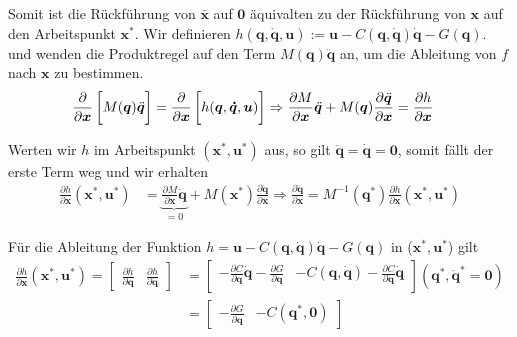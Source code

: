 \documentclass[a4paper, 12pt]{scrartcl}
\begin{document}
Somit ist die Rückführung von $\bar{\bm{x}}$ auf $\bm{0}$ 
äquivalten zu der Rückführung von $\bm{x}$ auf den Arbeitspunkt $\bm{x}^*$.
Wir definieren 
$h(\bm{q} , \bm{\dot{q}}, \bm{u}):= \bm{u} - C(\bm{q},\bm{\dot{q}}) \bm{\dot{q}} - G(\bm{q})$.
und wenden die Produktregel auf den Term $M(\bm{q}) \ddot{\bm{q}}$ an, um die Ableitung von $f$ nach $\bm{x}$ zu bestimmen.
\begin{align*}
    \frac{\partial}{\partial \bm{x}} 
    \left[ 
        \vphantom{\int}
        M(\bm{q}) \ddot{\bm{q}}
    \right] 
    &= 
    \frac{\partial}{\partial \bm{x}} 
    \left[
        \vphantom{\int}
        h(\bm{q}, \bm{\dot{q}}, \bm{u})
    \right]
    \Rightarrow
    \frac{\partial M}{\partial \bm{x}} \ddot{\bm{q}} 
    + M(\bm{q}) \frac{\partial \ddot{\bm{q}}}{\partial \bm{x}} 
    = 
    \frac{\partial h}{\partial \bm{x}}
\end{align*}

Werten wir $h$ im Arbeitspunkt $(\bm{x}^*, \bm{u}^*)$ aus, 
so gilt $\ddot{\bm{q}} = \bm{\dot{q}} = \bm{0}$, 
somit fällt der erste Term weg und wir erhalten
\begin{align*}
    \frac{\partial h}{\partial \bm{x}}(\bm{x}^*, \bm{u}^*)
    &=
    \underbrace{
        \frac{\partial M}{\partial \bm{x}} \ddot{\bm{q}} 
        }_{=0}
    + M(\bm{x}^*) \frac{\partial \ddot{\bm{q}}}{\partial \bm{x}}  
    \Rightarrow
    \frac{\partial \ddot{\bm{q}}}{\partial \bm{x}} 
    = 
    M^{-1}(\bm{q}^*) \frac{\partial h}{\partial \bm{x}}(\bm{x}^*, \bm{u}^*)
\end{align*}

Für die Ableitung der Funktion $h = \bm{u} - C(\bm{q}, \bm{\dot{q}}) \bm{\dot{q}} - G(\bm{q})$ in ($\bm{x}^*, \bm{u}^*$) gilt
\begin{align*}
    \frac{\partial h}{\partial \bm{x}}(\bm{x}^*, \bm{u}^*)
    =
    \begin{bmatrix}
        \frac{\partial h}{\partial \bm{q}} & \frac{\partial h}{\partial \bm{\dot{q}}}
    \end{bmatrix}
    &=
    \begin{bmatrix}
        -\frac{\partial C}{\partial \bm{q}} \bm{\dot{q}} - \frac{\partial G}{\partial \bm{q}} & -C(\bm{q}, \bm{\dot{q}}) - \frac{\partial C}{\partial \bm{\dot{q}}} \bm{\dot{q}} \\
    \end{bmatrix}
    (\bm{q}^*, \bm{\dot{q}}^* = \bm{0}) \\
    &=
    \begin{bmatrix}
        -\frac{\partial G}{\partial \bm{q}} & -C(\bm{q}^*, \bm{0})
    \end{bmatrix}
\end{align*}
\end{document}
